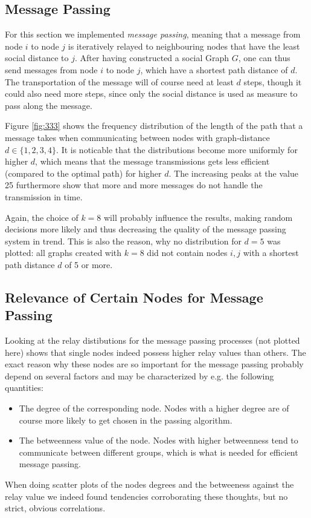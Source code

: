 \documentclass{scrartcl}
\begin{document}
\subsection{Message Passing}
For this section we implemented \emph{message passing}, meaning that
a message from node $i$ to node $j$ is iteratively relayed to neighbouring
nodes that have the least social distance to $j$. 
After having constructed a social Graph $G$, one can thus send messages
from node $i$ to node $j$, which have a shortest path distance of $d$.  The
transportation of the message will of course need at least $d$ steps,
though it could also need more steps, since only the social distance is
used as measure to pass along the message.

Figure \ref{fig:333} shows the frequency distribution of the length of the
path that a message takes when communicating between nodes with
graph-distance $d\in\{1, 2, 3, 4\}$. It is noticable that the distributions
become more uniformly for higher $d$, which means that the message
transmissions gets less efficient (compared to the optimal path) for higher
$d$. The increasing peaks at the value 25 furthermore show that more and
more messages do not handle the transmission in time.

Again, the choice of $k = 8$ will probably influence the results, making
random decisions more likely and thus decreasing the quality of the message
passing system in trend. This is also the reason, why no distribution for
$d = 5$ was plotted: all graphs created with $ k = 8$ did not contain nodes
$i,j$ with a shortest path distance $d$ of 5 or more.

\subsection{Relevance of Certain Nodes for Message Passing}
Looking at the relay distibutions for the message passing processes (not
plotted here) shows that single nodes indeed possess higher relay values
than others. The exact reason why these nodes are so important for the
message passing probably depend on several factors and may be characterized
by e.g. the following quantities:
\begin{itemize}
   \item The degree of the corresponding node. Nodes with a higher degree
       are of course more likely to get chosen in the passing algorithm.
   \item The betweenness value of the node. Nodes with higher betweenness
       tend to communicate between different groups, which is what is
       needed for efficient message passing.
\end{itemize}
When doing scatter plots of the nodes degrees and the betweeness against
the relay value we indeed found tendencies corroborating these thoughts,
but no strict, obvious correlations.
\end{document}
